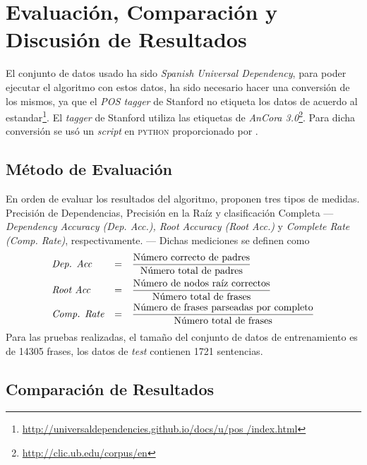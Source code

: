 \chapter{Evaluación, Comparación y Discusión de Resultados}
\label{ch:eval}

El conjunto de datos usado ha sido \emph{Spanish Universal Dependency}, para
poder ejecutar el algoritmo con estos datos, ha sido necesario hacer una
conversión de los mismos, ya que el \emph{\ac{POS} tagger} de Stanford no
etiqueta los datos de acuerdo al
estandar\footnote{\url{http://universaldependencies.github.io/docs/u/pos
    /index.html}}. El \emph{tagger} de Stanford utiliza las etiquetas de
\emph{AnCora 3.0}\footnote{\url{http://clic.ub.edu/corpus/en}}. Para dicha
conversión se usó un \emph{script} en \textsc{python} proporcionado por
\citeauthor{rohit2016} \cite{rohit2016}.

\section{Método de Evaluación}
\label{sec:eval}

En orden de evaluar los resultados del algoritmo, \citeauthor{yamada2003}
proponen tres tipos de medidas. Precisión de Dependencias, Precisión en la Raíz
y clasificación Completa --- \emph{Dependency Accuracy (Dep. Acc.), Root
  Accuracy (Root Acc.)} y \emph{Complete Rate (Comp. Rate)},
respectivamente. --- Dichas mediciones se definen como
\begin{equation*}
  \begin{aligned}
    & \text{\emph{Dep. Acc}} &=& \quad\frac{\text{Número correcto de padres}}{\text{Número
        total de padres}} \\
    & \text{\emph{Root Acc}} &=& \quad\frac{\text{Número de nodos raíz correctos}}{\text{Número
        total de frases}} \\
    & \text{\emph{Comp. Rate}} &=& \quad\frac{\text{Número de frases
        parseadas por completo}}{\text{Número total de frases}} 
  \end{aligned}
\end{equation*}
Para las pruebas realizadas, el tamaño del conjunto de datos de entrenamiento es
de 14305 frases, los datos de \emph{test} contienen 1721 sentencias.

\section{Comparación de Resultados}
\label{sec:results}

